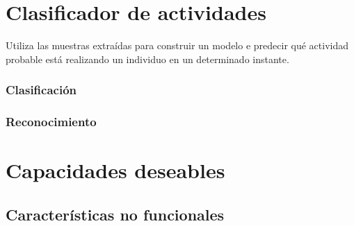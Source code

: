 \section{Clasificador de actividades}

\label{sec45:clasificador}Utiliza las muestras extraídas para construir
un modelo e predecir qué actividad probable está realizando un individuo
en un determinado instante.

\subsubsection{Clasificación}

\subsubsection{Reconocimiento}

\section{Capacidades deseables}

\subsection{Características no funcionales}

